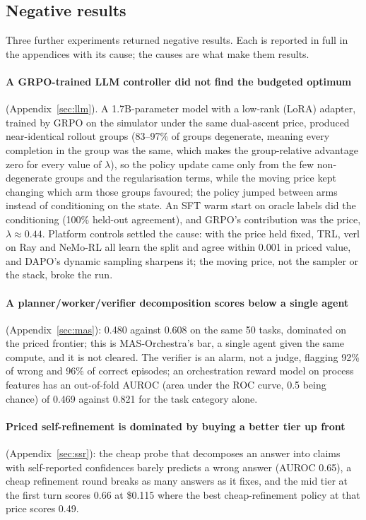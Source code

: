 \documentclass[10pt]{article}
\begin{document}
\subsection{Negative results}
\label{sec:negatives}

Three further experiments returned negative results. Each is reported in full in the appendices with its cause; the causes are what make them results.

\paragraph{A GRPO-trained LLM controller did not find the budgeted optimum} (Appendix~\ref{sec:llm}). A 1.7B-parameter model with a low-rank (LoRA) adapter, trained by GRPO on the simulator under the same dual-ascent price, produced near-identical rollout groups (83--97\% of groups degenerate, meaning every completion in the group was the same, which makes the group-relative advantage zero for every value of $\lambda$), so the policy update came only from the few non-degenerate groups and the regularisation terms, while the moving price kept changing which arm those groups favoured; the policy jumped between arms instead of conditioning on the state. An SFT warm start on oracle labels did the conditioning (100\% held-out agreement), and GRPO's contribution was the price, $\lambda\approx0.44$. Platform controls settled the cause: with the price held fixed, TRL, verl on Ray and NeMo-RL all learn the split and agree within 0.001 in priced value, and DAPO's dynamic sampling sharpens it; the moving price, not the sampler or the stack, broke the run.

\paragraph{A planner/worker/verifier decomposition scores below a single agent} (Appendix~\ref{sec:mas}): 0.480 against 0.608 on the same 50 tasks, dominated on the priced frontier; this is MAS-Orchestra's bar, a single agent given the same compute, and it is not cleared. The verifier is an alarm, not a judge, flagging 92\% of wrong and 96\% of correct episodes; an orchestration reward model on process features has an out-of-fold AUROC (area under the ROC curve, 0.5 being chance) of 0.469 against 0.821 for the task category alone.

\paragraph{Priced self-refinement is dominated by buying a better tier up front} (Appendix~\ref{sec:ssr}): the cheap probe that decomposes an answer into claims with self-reported confidences barely predicts a wrong answer (AUROC 0.65), a cheap refinement round breaks as many answers as it fixes, and the mid tier at the first turn scores 0.66 at \$0.115 where the best cheap-refinement policy at that price scores 0.49.
\end{document}
